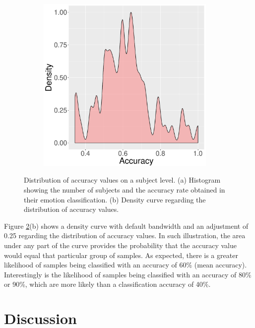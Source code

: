 \begin{figure}[ht]
\begin{subfigure}[b]{0.5\textwidth}
    \includegraphics[width=0.95\textwidth]{Content/figures/experiment2-density-user}
    \caption{}
    \label{fig:experiment2-chart-density}
  \end{subfigure}
  \caption{Distribution of accuracy values on a subject level. (a) Histogram showing the number of subjects and the accuracy rate obtained in their emotion classification. (b) Density curve regarding the distribution of accuracy values.}
  \label{fig:experiment2-result-charts}
\end{figure}

Figure \ref{fig:experiment2-result-charts}(b) shows a density curve with default bandwidth and an adjustment of 0.25 regarding the distribution of accuracy values. In such illustration, the area under any part of the curve provides the probability that the accuracy value would equal that particular group of samples. As expected, there is a greater likelihood of samples being classified with an accuracy of 60\% (mean accuracy). Interestingly is the likelihood of samples being classified with an accuracy of 80\% or 90\%, which are more likely than a classification accuracy of 40\%.


\section{Discussion}

